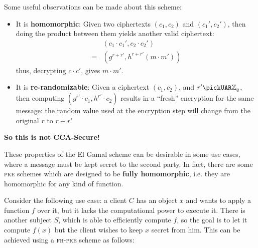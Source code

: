 Some useful observations can be made about this scheme:
\begin{itemize}
    \item It is \textbf{homomorphic}: Given two ciphertexts $(c_1, c_2)$ and $(c_1', c_2')$, then doing the product between them yields another valid ciphertext:
    \begin{align*}
        & (c_1\cdot c_1', c_2\cdot c_2') \\
        =& (g^{r+r'}, h^{r+r'}(m\cdot m'))
    \end{align*}
    thus, decrypting $c\cdot c'$, gives $m\cdot m'$.
    
    \item It is \textbf{re-randomizable}: Given a ciphertext $(c_1, c_2)$, and $r' \pickUAR \mathbb{Z}_q$, then computing $(g^{r'}\cdot c_1, h^{r'}\cdot c_2)$ results in a ``fresh'' encryption for the same message: the random value used at the encryption step will change from the original $r$ to $r+r'$
\end{itemize}
\textbf{So this is not CCA-Secure!}

These properties of the El Gamal scheme can be desirable in some use cases, where a message must be kept secret to the second party. In fact, there are some \textsc{pke} schemes which are designed to be \textbf{fully homomorphic}, i.e. they are homomorphic for any kind of function.

Consider the following use case: a client $C$ has an object $x$ and wants to apply a function $f$ over it, but it lacks the computational power to execute it. There is another subject $S$, which is able to efficiently compute $f$, so the goal is to let it compute $f(x)$ but the client wishes to keep $x$ secret from him. This can be achieved using a \textsc{fh-pke} scheme as follows:


